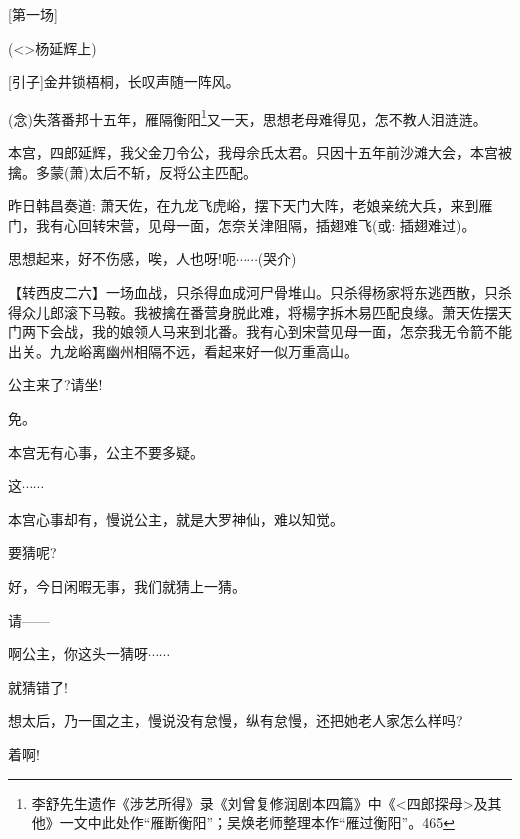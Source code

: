 {{{[}第一场{]}}

(\textless{}\!\textgreater{}杨延辉上)

{[}{\akai 引子}{]}金井锁梧桐，长叹声随一阵风。

({\akai 念})失落番邦十五年，雁隔衡阳\footnote{ 李舒先生遗作《涉艺所得》录《刘曾复修润剧本四篇》中《\textless{}四郎探母\textgreater{}及其他》一文中此处作``雁断衡阳''；吴焕老师整理本作``雁过衡阳''。{465}}又一天，思想老母难得见，怎不教人泪涟涟。

本宫，四郎延辉，我父金刀令公，我母佘氏太君。只因十五年前沙滩大会，本宫被擒。多蒙(萧)太后不斩，反将公主匹配。

昨日韩昌奏道: 萧天佐，在九龙飞虎峪，摆下天门大阵，老娘亲统大兵，来到雁门，我有心回转宋营，见母一面，怎奈关津阻隔，插翅难飞({\akai 或}: 插翅难过)。

思想起来，好不伤感，唉，人也呀!呃$\cdots{}\cdots{}$(哭介)


【{\footnotesize 转}{\akai 西皮二六}】一场血战，只杀得血成河尸骨堆山。只杀得杨家将东逃西散，只杀得众儿郎滚下马鞍。我被擒在番营身脱此难，将楊字拆木易匹配良缘。萧天佐摆天门两下会战，我的娘领人马来到北番。我有心到宋营见母一面，怎奈我无令箭不能出关。九龙峪离幽州相隔不远，看起来好一似万重高山。



公主来了?请坐!

免。

本宫无有心事，公主不要多疑。

这$\cdots{}\cdots{}$

本宫心事却有，慢说公主，就是大罗神仙，难以知觉。

要猜呢?

好，今日闲暇无事，我们就猜上一猜。

请------

啊公主，你这头一猜呀$\cdots{}\cdots{}$

就猜错了!

想太后，乃一国之主，慢说没有怠慢，纵有怠慢，还把她老人家怎么样吗?

着啊!

}
